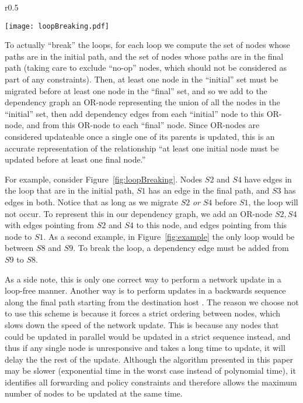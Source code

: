 \documentclass[pageno]{jpaper}
\begin{document}
\begin{wrapfigure}{r}{0.5\textwidth}
    \vspace{-30pt}
    \caption{\label{fig:loopBreaking}}
    \texttt{[image: loopBreaking.pdf]}
    \vspace{-20pt}
\end{wrapfigure}

To actually ``break'' the loops, for each loop we compute the set of nodes whose paths are in the initial path, and the set of nodes whose paths are in the final path (taking care to exclude ``no-op'' nodes, which should not be considered as part of any constraints). Then, at least one node in the ``initial'' set must be migrated before at least one node in the ``final'' set, and so we add to the dependency graph an OR-node representing the union of all the nodes in the ``initial'' set, then add dependency edges from each ``initial'' node to this OR-node, and from this OR-node to each ``final'' node. Since OR-nodes are considered updateable once a single one of its parents is updated, this is an accurate representation of the relationship ``at least one initial node must be updated before at least one final node.''

For example, consider Figure~\ref{fig:loopBreaking}. Nodes $S2$ and $S4$ have edges in the loop that are in the initial path, $S1$ has an edge in the final path, and $S3$ has edges in both. Notice that as long as we migrate $S2$ \textit{or} $S4$ before $S1$, the loop will not occur. To represent this in our dependency graph, we add an OR-node $S2,S4$ with edges pointing from $S2$ and $S4$ to this node, and edges pointing from this node to $S1$. As a second example, in Figure~\ref{fig:example} the only loop would be between $S8$ and $S9$. To break the loop, a dependency edge must be added from $S9$ to $S8$.

As a side note, this is only one correct way to perform a network update in a loop-free manner. Another way is to perform updates in a backwards sequence along the final path starting from the destination host \cite{francois05}. The reason we choose not to use this scheme is because it forces a strict ordering between nodes, which slows down the speed of the network update. This is because any nodes that could be updated in parallel would be updated in a strict sequence instead, and thus if any single node is unresponsive and takes a long time to update, it will delay the the rest of the update. Although the algorithm presented in this paper may be slower (exponential time in the worst case instead of polynomial time), it identifies all forwarding and policy constraints and therefore allows the maximum number of nodes to be updated at the same time.
\end{document}
